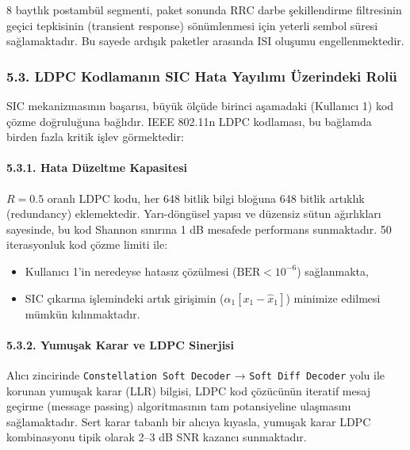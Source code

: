 \documentclass[
]{IEEEtran}
\providecommand{\tightlist}{%
  \setlength{\itemsep}{0pt}\setlength{\parskip}{0pt}}
\begin{document}
8 baytlık postambül segmenti, paket sonunda RRC darbe şekillendirme
filtresinin geçici tepkisinin (transient response) sönümlenmesi için
yeterli sembol süresi sağlamaktadır. Bu sayede ardışık paketler arasında
ISI oluşumu engellenmektedir.

\subsubsection{5.3. LDPC Kodlamanın SIC Hata Yayılımı Üzerindeki
Rolü}\label{ldpc-kodlamanux131n-sic-hata-yayux131lux131mux131-uxfczerindeki-roluxfc}

SIC mekanizmasının başarısı, büyük ölçüde birinci aşamadaki (Kullanıcı
1) kod çözme doğruluğuna bağlıdır. IEEE 802.11n LDPC kodlaması, bu
bağlamda birden fazla kritik işlev görmektedir:

\paragraph{5.3.1. Hata Düzeltme
Kapasitesi}\label{hata-duxfczeltme-kapasitesi}

\(R = 0.5\) oranlı LDPC kodu, her 648 bitlik bilgi bloğuna 648 bitlik
artıklık (redundancy) eklemektedir. Yarı-döngüsel yapısı ve düzensiz
sütun ağırlıkları sayesinde, bu kod Shannon sınırına 1 dB mesafede
performans sunmaktadır. 50 iterasyonluk kod çözme limiti ile:

\begin{itemize}
\tightlist
\item
  Kullanıcı 1'in neredeyse hatasız çözülmesi (\(\text{BER} < 10^{-6}\))
  sağlanmakta,
\item
  SIC çıkarma işlemindeki artık girişimin
  (\(\alpha_1[x_1 - \hat{x}_1]\)) minimize edilmesi mümkün
  kılınmaktadır.
\end{itemize}

\paragraph{5.3.2. Yumuşak Karar ve LDPC
Sinerjisi}\label{yumuux15fak-karar-ve-ldpc-sinerjisi}

Alıcı zincirinde \texttt{Constellation\ Soft\ Decoder} →
\texttt{Soft\ Diff\ Decoder} yolu ile korunan yumuşak karar (LLR)
bilgisi, LDPC kod çözücünün iteratif mesaj geçirme (message passing)
algoritmasının tam potansiyeline ulaşmasını sağlamaktadır. Sert karar
tabanlı bir alıcıya kıyasla, yumuşak karar LDPC kombinasyonu tipik
olarak 2--3 dB SNR kazancı sunmaktadır.
\end{document}
